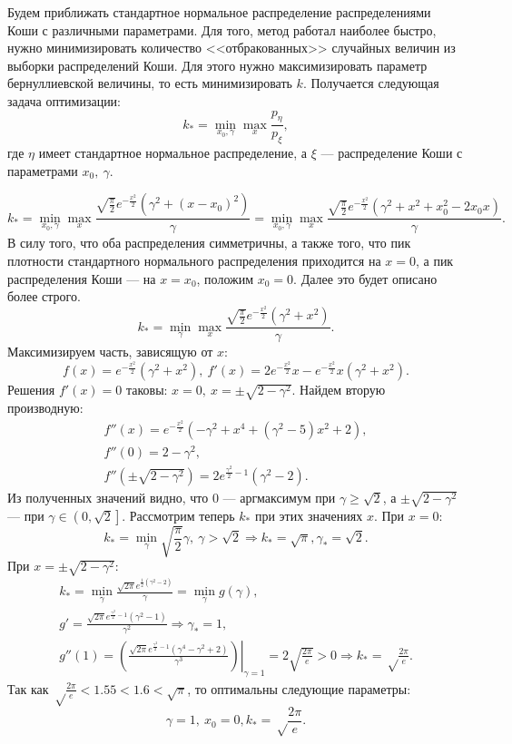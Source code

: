\documentclass[12pt, a4paper]{article}
\begin{document}
Будем приближать стандартное нормальное распределение распределениями Коши с различными параметрами. Для того, метод работал наиболее быстро, нужно минимизировать количество <<отбракованных>> случайных величин из выборки распределений Коши. Для этого нужно максимизировать параметр бернуллиевской величины, то есть минимизировать $k$. Получается следующая задача оптимизации:
\[ k_* = \min\limits_{x_0,\gamma} \max\limits_{x} \frac{p_\eta}{p_\xi}, \]
где $\eta$ имеет стандартное нормальное распределение, а $\xi$ --- распределение Коши с параметрами $x_0,\ \gamma$. 

\[k_* = 
	\min\limits_{x_0,\gamma} \max\limits_{x} \frac{\sqrt{\frac{\pi }{2}} e^{-\frac{x^2}{2}} \left(\gamma
	   ^2+(x-x_0)^2\right)}{\gamma } = \min\limits_{x_0,\gamma} \max\limits_{x} \frac{\sqrt{\frac{\pi }{2}} e^{-\frac{x^2}{2}} \left(\gamma^2+x^2+x_0^2-2x_0x\right)}{\gamma }.\]
В силу того, что оба распределения симметричны, а также того, что пик плотности стандартного нормального распределения приходится на $x = 0$, а пик распределения Коши --- на $x = x_0$, положим $x_0 = 0$. Далее это будет описано более строго.
\[ k_* = \min\limits_{\gamma} \max\limits_{x} \frac{\sqrt{\frac{\pi }{2}} e^{-\frac{x^2}{2}} \left(\gamma^2+x^2\right)}{\gamma }.\]
Максимизируем часть, зависящую от $x$:
\[f(x) = e^{-\frac{x^2}{2}}(\gamma^2+x^2),\ f'(x)=2 e^{-\frac{x^2}{2}} x-e^{-\frac{x^2}{2}} x \left(\gamma ^2+x^2\right). \]
Решения $f'(x)=0$ таковы: $x = 0,\ x=\pm\sqrt{2-\gamma^2}$. Найдем вторую производную:
\begin{gather*}
f''(x) = e^{-\frac{x^2}{2}} \left(-\gamma ^2+x^4+\left(\gamma ^2-5\right) x^2+2\right), \\
f''(0) = 2 - \gamma^2, \\
f''(\pm\sqrt{2-\gamma^2}) = 2 e^{\frac{\gamma ^2}{2}-1} \left(\gamma ^2-2\right).
\end{gather*}
Из полученных значений видно, что $0$ --- аргмаксимум при $\gamma \geqslant \sqrt{2}$, а $\pm\sqrt{2-\gamma^2}$ --- при $\gamma\in \left(0,\sqrt{2}\right].$ Рассмотрим теперь $k_*$ при этих значениях $x$. При $x = 0$:
\[k_* = \min\limits_\gamma \sqrt{\frac{\pi }{2}} \gamma,\ \gamma>\sqrt{2} \Rightarrow k_*= \sqrt{\pi}, \gamma_*=\sqrt{2}.\]
При $x=\pm\sqrt{2-\gamma^2}$:
\begin{gather*}
k_* = \min\limits_{\gamma} \frac{\sqrt{2 \pi } e^{\frac{1}{2} \left(\gamma ^2-2\right)}}{\gamma } = \min\limits_{\gamma} g(\gamma), \\
g' = \frac{\sqrt{2 \pi } e^{\frac{\gamma ^2}{2}-1} \left(\gamma ^2-1\right)}{\gamma ^2} \Rightarrow \gamma_*=1, \\
g''(1) = \left. \left( \frac{\sqrt{2 \pi } e^{\frac{\gamma ^2}{2}-1} \left(\gamma ^4-\gamma
   ^2+2\right)}{\gamma ^3} \right)\right|_{\gamma = 1} = 2 \sqrt{\frac{2 \pi }{e}} > 0 \Rightarrow k_*=\sqrt\frac{2\pi}e. 
\end{gather*}
Так как $\sqrt\frac{2\pi}e < 1.55 < 1.6 < \sqrt{\pi}$, то оптимальны следующие параметры:
\[ \gamma = 1,\ x_0 = 0, k_*=\sqrt\frac{2\pi}e.\]
\end{document}
